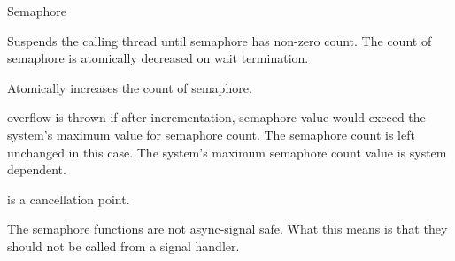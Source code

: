 \begin{classpage}{Semaphore}
\begin{mandescription}
  Suspends the calling thread until  semaphore has non-zero count.
  The count of  semaphore is atomically decreased on wait termination.
  
  Atomically increases the count of  semaphore.
  \begin{exception}
    \item[overflow] is thrown if after incrementation,
       semaphore value would exceed the system's maximum
      value for semaphore count. The semaphore count is left
      unchanged in this case. The system's maximum semaphore count
      value is system dependent.
  \end{exception}
\end{mandescription}

 is a cancellation point.

  The semaphore functions are not async-signal safe. What this means is
  that they should not be called from a signal handler.

\end{classpage}
